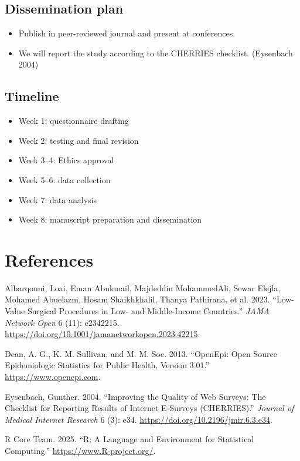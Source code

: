 \documentclass[
  letterpaper,
  DIV=11,
  numbers=noendperiod]{scrartcl}
\newlength{\cslhangindent}
\newenvironment{CSLReferences}[2] %
 {\begin{list}{}{%
  \setlength{\itemindent}{0pt}
  \setlength{\leftmargin}{0pt}
  \setlength{\parsep}{0pt}
  \ifodd #1
   \setlength{\leftmargin}{\cslhangindent}
   \setlength{\itemindent}{-1\cslhangindent}
  \fi
  \setlength{\itemsep}{#2\baselineskip}}}
 {\end{list}}
\begin{document}
\subsection{Dissemination plan}\label{dissemination-plan}

\begin{itemize}
\item
  Publish in peer-reviewed journal and present at conferences.
\item
  We will report the study according to the CHERRIES checklist.
  (Eysenbach 2004)
\end{itemize}

\subsection{Timeline}\label{timeline}

\begin{itemize}
\item
  Week 1: questionnaire drafting
\item
  Week 2: testing and final revision
\item
  Week 3--4: Ethics approval
\item
  Week 5--6: data collection
\item
  Week 7: data analysis
\item
  Week 8: manuscript preparation and dissemination
\end{itemize}

\section*{References}\label{references}

\label{refs}
\begin{CSLReferences}{1}{0}
Albarqouni, Loai, Eman Abukmail, Majdeddin MohammedAli, Sewar Elejla,
Mohamed Abuelazm, Hosam Shaikhkhalil, Thanya Pathirana, et al. 2023.
{``Low-Value Surgical Procedures in Low- and Middle-Income Countries.''}
\emph{JAMA Network Open} 6 (11): e2342215.
\url{https://doi.org/10.1001/jamanetworkopen.2023.42215}.

Dean, A. G., K. M. Sullivan, and M. M. Soe. 2013. {``OpenEpi: Open
Source Epidemiologic Statistics for Public Health, Version 3.01.''}
\url{https://www.openepi.com}.

Eysenbach, Gunther. 2004. {``Improving the Quality of Web Surveys: The
Checklist for Reporting Results of Internet E-Surveys (CHERRIES).''}
\emph{Journal of Medical Internet Research} 6 (3): e34.
\url{https://doi.org/10.2196/jmir.6.3.e34}.

R Core Team. 2025. {``R: A Language and Environment for Statistical
Computing.''} \url{https://www.R-project.org/}.

\end{CSLReferences}
\end{document}

